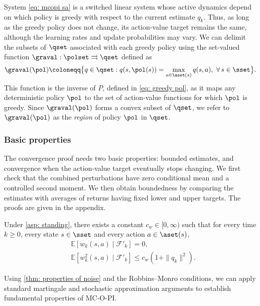 System \eqref{eq: mcopi sa} is a switched linear system whose active dynamics depend on which policy is greedy with respect to the current estimate $q_k$.
Thus, as long as the greedy policy does not change, its action-value target remains the same, although the learning rates and update probabilities may vary.
We can delimit the subsets of $\qset$ associated with each greedy policy using the set-valued function $\graval : \polset \rightrightarrows \qset$ defined as
\begin{align}
\label{eq: greedy action values}
    \graval(\pol) \coloneqq \big\{ q \in \qset : q(s, \pol(s)) = \max_{a \in \aset(s)} q(s,a), \ \forall \, s \in \sset \big\} .
\end{align}
This function is the inverse of $P$, defined in \eqref{eq: greedy pol}, as it maps any deterministic policy $\pol$ to the set of action-value functions for which $\pol$ is greedy.
Since $\graval(\pol)$ forms a convex subset of $\qset$, we refer to $\graval(\pol)$ as the \textit{region} of policy $\pol$ in $\qset$.

\subsubsection{Basic properties}
\label{sec: replacement foundations}
The convergence proof needs two basic properties: bounded estimates, and convergence when the action-value target eventually stops changing.
We first check that the combined perturbations have zero conditional mean and a controlled second moment. We then obtain boundedness by comparing the estimates with averages of returns having fixed lower and upper targets. The proofs are given in the appendix.

\begin{lemma}
\label{thm: properties of noise}
Under \autoref{asp: standing}, there exists a constant $c_w \in [0, \infty)$
such that for every time $k \ge 0$, every state $s \in \sset$ and every action $a \in \aset(s)$,
\begin{align}
\label{eq: muw_mds}
&\mathbb E\!\left[w_k(s,a) \mid \mathcal F'_k\right] = 0,
\\
\label{eq: muw_second_moment}
&\mathbb E\!\left[w_k^2(s,a) \mid \mathcal F'_k\right]
\le c_w(1+\|q_k\|^2) .
\end{align}
\end{lemma}

Using \autoref{thm: properties of noise} and the Robbins--Monro conditions,
we can apply standard martingale and stochastic approximation arguments to establish fundamental properties of MC-O-PI.

